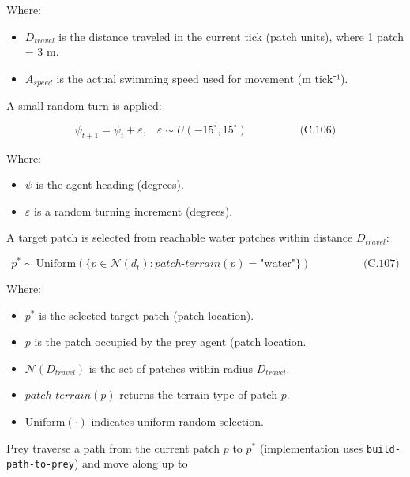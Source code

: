 \documentclass[
]{book}
\providecommand{\tightlist}{%
  \setlength{\itemsep}{0pt}\setlength{\parskip}{0pt}}
\begin{document}
Where:

\begin{itemize}
\tightlist
\item
  \(D_{travel}\) is the distance traveled in the current tick (patch
  units), where 1 patch = 3 m.
\item
  \(A_{speed}\) is the actual swimming speed used for movement (m
  tick⁻¹).
\end{itemize}

A small random turn is applied:

\[
\begin{equation} \psi_{t+1} = \psi_t + \varepsilon,\;\;\; \varepsilon \sim U(-15^\circ, 15^\circ)  \hspace{2cm} \text{(C.106)} \end{equation}
\]

Where:

\begin{itemize}
\tightlist
\item
  \(\psi\) is the agent heading (degrees).
\item
  \(\varepsilon\) is a random turning increment (degrees).
\end{itemize}

A target patch is selected from reachable water patches within distance
\(D_{travel}\):

\[
\begin{equation} p^* \sim \text{Uniform}\left(\{p \in \mathcal{N}(d_t) : patch\text{-}terrain(p)=\text{"water"}\}\right)  \hspace{2cm} \text{(C.107)} \end{equation}
\]

Where:

\begin{itemize}
\tightlist
\item
  \(p^*\) is the selected target patch (patch location).
\item
  \(p\) is the patch occupied by the prey agent (patch location.
\item
  \(\mathcal{N}(D_{travel})\) is the set of patches within radius
  \(D_{travel}\).
\item
  \(patch\text{-}terrain(p)\) returns the terrain type of patch \(p\).
\item
  \(\text{Uniform}(\cdot)\) indicates uniform random selection.
\end{itemize}

Prey traverse a path from the current patch \(p\) to \(p^*\) (implementation
uses \texttt{build-path-to-prey}) and move along up to
\end{document}
